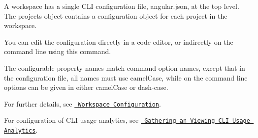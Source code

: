 A workspace has a single CLI configuration file, {\ttfamily angular.\+json}, at the top level. The {\ttfamily projects} object contains a configuration object for each project in the workspace.

You can edit the configuration directly in a code editor, or indirectly on the command line using this command.

The configurable property names match command option names, except that in the configuration file, all names must use camel\+Case, while on the command line options can be given in either camel\+Case or dash-\/case.

For further details, see \href{guide/workspace-config}{\texttt{ Workspace Configuration}}.

For configuration of CLI usage analytics, see \href{./usage-analytics-gathering}{\texttt{ Gathering an Viewing CLI Usage Analytics}}. 